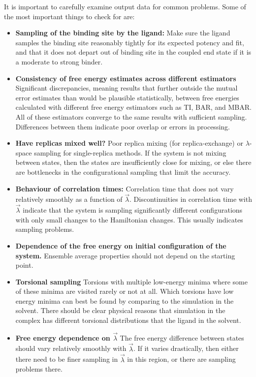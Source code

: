\documentclass[9pt,bestpractices]{livecoms}
\begin{document}
It is important to carefully examine output data for common problems. Some of the most important things to check for are:
\begin{itemize}
\item \textbf{Sampling of the binding site by the ligand:} Make sure the ligand samples the binding site reasonably tightly for its expected potency and fit, and that it does not depart out of binding site in the coupled end state if it is a moderate to strong binder. 
\item \textbf{Consistency of free energy estimates across different estimators} Significant discrepancies, meaning results that further outside the mutual error estimates than would be plausible statistically, between free energies calculated with different free energy estimators such as TI, BAR, and MBAR. All of these estimators converge to the same results with sufficient sampling. Differences between them indicate poor overlap or errors in processing.
\item \textbf{Have replicas mixed well?} Poor replica mixing (for replica-exchange) or $\lambda$-space sampling for single-replica methods. If the system is not mixing between states, then the states are insufficiently close for mixing, or else there are bottlenecks in the configurational sampling that limit the accuracy.
\item \textbf{Behaviour of correlation times:} Correlation time that does not vary relatively smoothly as a function of $\vec{\lambda}$. Discontinuities in correlation time with $\vec{\lambda}$ indicate that the system is sampling significantly different configurations with only small changes to the Hamiltonian changes. This usually indicates sampling problems.
\item \textbf{Dependence of the free energy on initial configuration of the system.} Ensemble average properties should not depend on the starting point.
\item \textbf{Torsional sampling} Torsions with multiple low-energy minima where some of these minima are visited rarely or not at all. Which torsions have low energy minima can best be found by comparing to the simulation in the solvent. There should be clear physical reasons that simulation in the complex has different torsional distributions that the ligand in the solvent. 
\item \textbf{Free energy dependence on $\vec{\lambda}$} The free energy difference between states should vary relatively smoothly with $\vec{\lambda}$. If it varies drastically, then either there need to be finer sampling in $\vec{\lambda}$ in this region, or there are sampling problems there.

\end{itemize}
\end{document}
